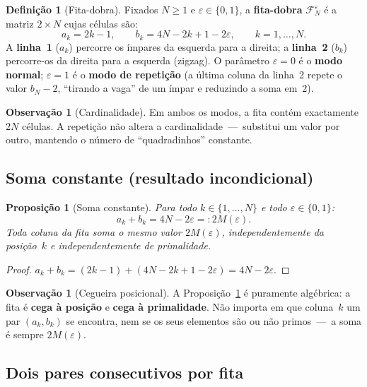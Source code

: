 \documentclass[12pt, a4paper]{article}
\theoremstyle{plain}
\newtheorem{proposition}[theorem]{Proposição}
\theoremstyle{definition}
\newtheorem{definition}[theorem]{Definição}
\newtheorem{remark}[theorem]{Observação}
\theoremstyle{remark}
\begin{document}
	\begin{definition}[Fita-dobra]
		\label{def:fita}
		Fixados $N\geq1$ e $\varepsilon\in\{0,1\}$, a
		\textbf{fita-dobra} $\mathcal{F}_N^\varepsilon$ é a matriz
		$2\times N$ cujas células são:
		\[
		a_k = 2k-1,
		\qquad
		b_k = 4N - 2k + 1 - 2\varepsilon,
		\qquad k=1,\dots,N.
		\]
		A \textbf{linha~1} ($a_k$) percorre os ímpares da esquerda para a
		direita; a \textbf{linha~2} ($b_k$) percorre-os da direita para a
		esquerda (zigzag).  O parâmetro $\varepsilon=0$ é o
		\textbf{modo normal}; $\varepsilon=1$ é o \textbf{modo de
			repetição} (a última coluna da linha~2 repete o valor $b_N-2$,
		``tirando a vaga'' de um ímpar e reduzindo a soma em~$2$).
	\end{definition}
	
	\begin{remark}[Cardinalidade]
		Em ambos os modos, a fita contém exactamente $2N$ células.
		A repetição não altera a cardinalidade~---~substitui um valor por
		outro, mantendo o número de ``quadradinhos'' constante.
	\end{remark}
	
	\subsection{Soma constante (resultado incondicional)}
	
	\begin{proposition}[Soma constante]
		\label{prop:soma}
		Para todo $k\in\{1,\dots,N\}$ e todo $\varepsilon\in\{0,1\}$:
		\[
		a_k + b_k = 4N - 2\varepsilon =: 2M(\varepsilon).
		\]
		Toda coluna da fita soma o mesmo valor $2M(\varepsilon)$,
		independentemente da posição~$k$ e independentemente de
		primalidade.
	\end{proposition}
	
	\begin{proof}
		$a_k+b_k = (2k-1)+(4N-2k+1-2\varepsilon) = 4N-2\varepsilon$.
	\end{proof}
	
	\begin{remark}[Cegueira posicional]
		A Proposição~\ref{prop:soma} é puramente algébrica: a fita é
		\textbf{cega à posição} e \textbf{cega à primalidade}.  Não
		importa em que coluna~$k$ um par $(a_k,b_k)$ se encontra, nem se
		os seus elementos são ou não primos~---~a soma é sempre
		$2M(\varepsilon)$.
	\end{remark}
	
	\subsection{Dois pares consecutivos por fita}
	
\end{document}
